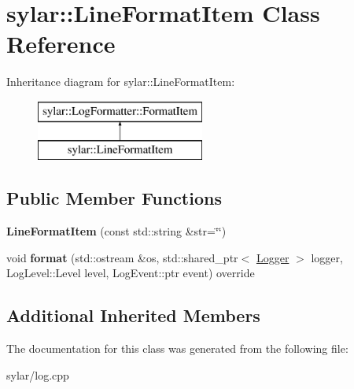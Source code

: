 \hypertarget{classsylar_1_1LineFormatItem}{\section{sylar\-:\-:Line\-Format\-Item Class Reference}
\label{classsylar_1_1LineFormatItem}
}
Inheritance diagram for sylar\-:\-:Line\-Format\-Item\-:\begin{figure}[H]
\begin{center}
\leavevmode
\includegraphics[height=2.000000cm]{classsylar_1_1LineFormatItem}
\end{center}
\end{figure}
\subsection*{Public Member Functions}
\begin{DoxyCompactItemize}
\item 
\hypertarget{classsylar_1_1LineFormatItem_addc037844fa51a81ff34790c37209cb9}{{\bfseries Line\-Format\-Item} (const std\-::string \&str=\char`\"{}\char`\"{})}\label{classsylar_1_1LineFormatItem_addc037844fa51a81ff34790c37209cb9}

\item 
\hypertarget{classsylar_1_1LineFormatItem_aea1e0f49b52814be841e9f73bd7faaf4}{void {\bfseries format} (std\-::ostream \&os, std\-::shared\-\_\-ptr$<$ \hyperlink{classsylar_1_1Logger}{Logger} $>$ logger, Log\-Level\-::\-Level level, Log\-Event\-::ptr event) override}\label{classsylar_1_1LineFormatItem_aea1e0f49b52814be841e9f73bd7faaf4}

\end{DoxyCompactItemize}
\subsection*{Additional Inherited Members}


The documentation for this class was generated from the following file\-:\begin{DoxyCompactItemize}
\item 
sylar/log.\-cpp\end{DoxyCompactItemize}
